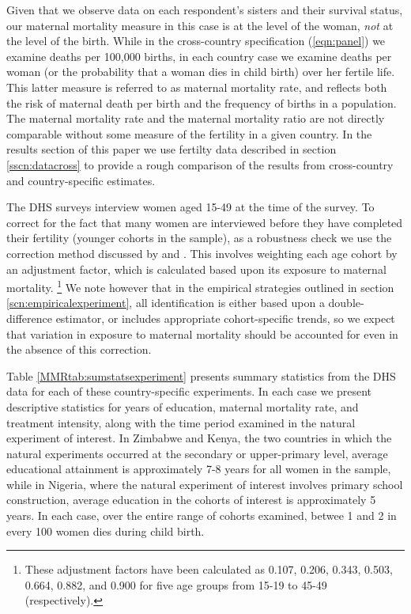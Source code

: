 \documentclass{article}[12pt,subeqn]
\begin{document}
\begin{spacing}{1.4}
Given that we observe data on each respondent's sisters and their survival 
status, our maternal mortality measure in this case is at the level of the woman, 
\emph{not} at the level of the birth.  While in the cross-country specification 
(\ref{eqn:panel}) we examine deaths per 100,000 births, in each country case we 
examine deaths per woman (or the probability that a woman dies in child birth) 
over her fertile life. This latter measure is referred to as maternal mortality 
rate, and reflects both the risk of maternal death per birth and the frequency of 
births in a population.  The maternal mortality rate and the maternal mortality 
ratio are not directly comparable without some measure of the fertility in a given 
country. In the results section of this paper we use fertilty data described in 
section \ref{sscn:datacross} to provide a rough comparison of the results from 
cross-country and country-specific estimates.

The DHS surveys interview women aged 15-49 at the time of the survey. To correct 
for the fact that many women are interviewed before they have completed their 
fertility (younger cohorts in the sample), as a robustness check we use the 
correction method discussed by \citet{RutsteinRojas2006} and 
\citet{Stantonetal1997}. This involves weighting each age cohort by an adjustment 
factor, which is calculated based upon its exposure to maternal mortality.
\footnote{These adjustment factors have been calculated as 0.107, 0.206, 0.343, 
0.503, 0.664, 0.882, and 0.900 for five age groups from 15-19 to 45-49 
(respectively).}  We note however that in the empirical strategies outlined in 
section \ref{scn:empiricalexperiment}, all identification is either based upon a 
double-difference estimator, or includes appropriate cohort-specific trends, so 
we expect that variation in exposure to maternal mortality should be accounted for 
even in the absence of this correction.

Table \ref{MMRtab:sumstatsexperiment} presents summary statistics from the DHS 
data for each of these country-specific experiments.  In each case we present 
descriptive statistics for years of education, maternal mortality rate, and 
treatment intensity, along with the time period examined in the natural 
experiment of interest.  In Zimbabwe and Kenya, the two countries in which the 
natural experiments occurred at the secondary or upper-primary level, average 
educational attainment is approximately 7-8 years for all women in the sample, 
while in Nigeria, where the natural experiment of interest involves primary school 
construction, average education in the cohorts of interest is approximately 5 
years.  In each case, over the entire range of cohorts examined, betwee 1 and 2 in 
every 100 women dies during child birth.


\end{spacing}
\end{document}
